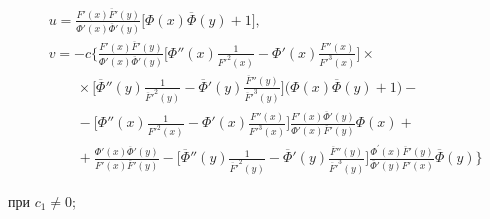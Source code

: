 \begin{equation}


\label{guryeva:j11}


\begin{aligned}


& u= \frac{F'(x)\overline{F}'(y)}{\Phi'(x)\overline{\Phi}'(y)}\bigl[\Phi(x)\overline{\Phi}(y)+1 \bigr],


\\


&v=-c\bigg\{


\frac{F'(x)\overline{F}'(y)}{\Phi'(x)\overline{\Phi}'(y)}


\biggl[\Phi''(x) \frac{1}{{F' }^{2}(x)}-\Phi' (x) \frac{F''(x)}{{F '}^{3}(x)} \biggr]\times


\\


&\qquad \times


\biggl[\overline{\Phi}''(y) \frac{1}{{\overline{F}'}^{2}(y)}-


\overline{\Phi}'(y) \frac{\overline{F}''(y)}{{\overline{F}'}^{3}(y)}\biggr]\bigl( \Phi(x)\overline{\Phi}(y)+1 \bigr) -


\\


&\qquad -


\biggl[\Phi''(x)  \frac{1}{{F' }^{2}(x)}-


\Phi'(x) \frac{F''(x)}{{F'}^{3}(x)}\biggr] \frac{F'(x)\overline{\Phi}'(y)}{\Phi'(x)\overline{F}'(y)}\Phi(x) +


\\


&\qquad +  \frac{\Phi'(x) \overline{\Phi}'(y)}{F'(x)\overline{F}'(y)}  -


\biggl[


\overline{\Phi}''(y) \frac{1}{{\overline{F}' }^{2}(y)}-


\overline{\Phi}'(y) \frac{\overline{F}''(y)}{{\overline{F}'}^{3}(y)}\biggr]


 \frac{ \Phi^{\prime


}(x)\overline{F}'(y)}{\overline{\Phi}'(y)F'(x)}\overline{\Phi}(y)


\bigg\}


\end{aligned}


\end{equation}


при $c_{1}\neq 0$;


